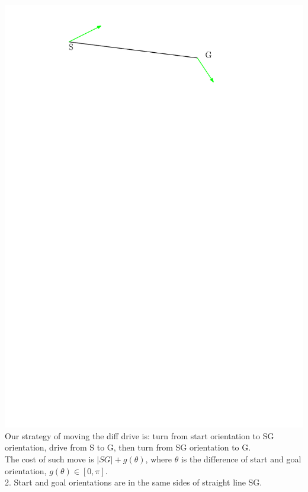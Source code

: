 \documentclass[12pt]{article}
\begin{document}
  \hspace*{2cm}\includegraphics[scale=0.8]{Path_general_case_2}\\
  
  Our strategy of moving the diff drive is: turn from start orientation to SG orientation, drive from S to G, then turn from SG orientation to G.\\
  
  The cost of such move is $|SG| + g(\theta)$, where $\theta$ is the difference of start and goal orientation, $g(\theta) \in [0, \pi]$.\\
  
  2. Start and goal orientations are in the same sides of straight line SG.\\
  
\end{document}
